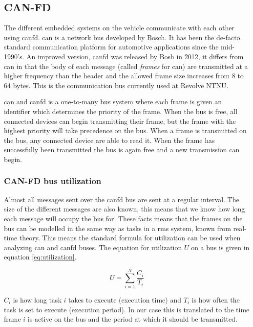 \subsection{CAN-FD}

The different embedded systems on the vehicle communicate with each other using \acrshort{canfd}. \acrfull{can} is a network bus developed by Bosch. It has been the de-facto standard communication platform for automotive applications since the mid-1990's. An improved version, \acrfull{canfd} was released by Bosh in 2012, it differs from \acrshort{can} in that the body of each message (called \emph{frames} for \acrshort{can}) are transmitted at a higher frequency than the header and the allowed frame size increases from 8 to 64 bytes. This is the communication bus currently used at Revolve NTNU.

\acrshort{can} and \acrshort{canfd} is a one-to-many bus system where each frame is given an identifier which determines the priority of the frame. When the bus is free, all connected devices can begin transmitting their frame, but the frame with the highest priority will take precedence on the bus. When a frame is transmitted on the bus, any connected device are able to read it. When the frame has successfully been transmitted the bus is again free and a new transmission can begin.

\subsubsection{CAN-FD bus utilization}

Almost all messages sent over the \acrshort{canfd} bus are sent at a regular interval. The size of the different messages are also known, this means that we know how long each message will occupy the bus for. These facts means that the frames on the bus can be modelled in the same way as tasks in a \acrfull{rms} system, known from real-time theory. This means the standard formula for utilization can be used when analyzing \acrshort{can} and \acrshort{canfd} buses. The equation for utilization $U$ on a bus is given in equation \ref{eq:utilization}. 

\begin{equation}
    U=\sum_{i=1}^N\frac{C_i}{T_i}
    \label{eq:utilization}
\end{equation}

$C_i$ is how long task $i$ takes to execute (execution time) and $T_i$ is how often the task is set to execute (execution period). In our case this is translated to the time frame $i$ is active on the bus and the period at which it should be transmitted. 



